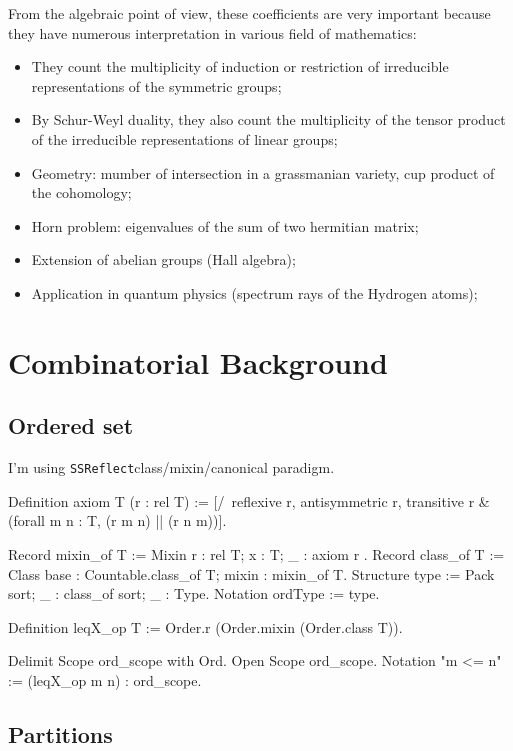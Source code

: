 \documentclass[12pt,a4paper]{article}
\newcommand{\SSR}{\texttt{SSReflect}}
\begin{document}
From the algebraic point of view, these coefficients are very important
because they have numerous interpretation in various field of mathematics:
\begin{itemize}
\item They count the multiplicity of induction or restriction of irreducible
  representations of the symmetric groups;
\item By Schur-Weyl duality, they also count the multiplicity of the tensor
  product of the irreducible representations of linear groups;
\item Geometry: mumber of intersection in a grassmanian variety, cup product
  of the cohomology;
\item Horn problem: eigenvalues of the sum of two hermitian matrix;
\item Extension of abelian groups (Hall algebra);
\item Application in quantum physics (spectrum rays of the Hydrogen atoms);
\end{itemize}


\section{Combinatorial Background}

\subsection{Ordered set}

  I'm using \SSR class/mixin/canonical paradigm.
\begin{coqcode}
Definition axiom T (r : rel T) :=
    [/\ reflexive r, antisymmetric r, transitive r &
        (forall m n : T, (r m n) || (r n m))].

Record mixin_of T := Mixin { r : rel T; x : T; _ : axiom r }.
Record class_of T := Class {base : Countable.class_of T; mixin : mixin_of T}.
Structure type := Pack {sort; _ : class_of sort; _ : Type}.
Notation ordType := type.

Definition leqX_op T := Order.r (Order.mixin (Order.class T)).

Delimit Scope ord_scope with Ord.
Open Scope ord_scope.
Notation "m <= n" := (leqX_op m n) : ord_scope.
\end{coqcode}

\subsection{Partitions}
\end{document}
